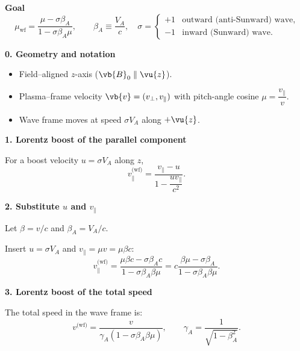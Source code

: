 \begin{tcolorbox}[colback=white, colframe=black, title={Step-by-Step Derivation of Pitch–Angle Cosine in the Wave Frame}]

\textbf{Goal}
\[
\boxed{
\mu_{\text{wf}} = \frac{\mu - \sigma \beta_A}{1 - \sigma \beta_A \mu}
},
\qquad
\beta_A \equiv \frac{V_A}{c}, \quad
\sigma =
\begin{cases}
+1 & \text{outward (anti-Sunward) wave},\\
-1 & \text{inward (Sunward) wave}.
\end{cases}
\]

\medskip

\textbf{0. Geometry and notation}

\begin{itemize}
\item Field–aligned $z$-axis ($\vb{B}_0 \parallel \vu{z}$).
\item Plasma–frame velocity $\vb{v} = (v_\perp, v_\parallel)$ with pitch-angle cosine $\mu = \dfrac{v_\parallel}{v}$.
\item Wave frame moves at speed $\sigma V_A$ along $+\vu{z}$.
\end{itemize}

\medskip

\textbf{1. Lorentz boost of the parallel component}

For a boost velocity $u = \sigma V_A$ along $z$,
\begin{equation}
v_\parallel^{\text{(wf)}} = 
\frac{v_\parallel - u}{1 - \dfrac{u v_\parallel}{c^2}}.
\tag{1}
\end{equation}

\medskip

\textbf{2. Substitute $u$ and $v_\parallel$}

Let $\beta = v/c$ and $\beta_A = V_A / c$.

Insert $u = \sigma V_A$ and $v_\parallel = \mu v = \mu \beta c$:
\begin{equation}
v_\parallel^{\text{(wf)}}
= \frac{\mu \beta c - \sigma \beta_A c}{1 - \sigma \beta_A \beta \mu}
= c \frac{\beta \mu - \sigma \beta_A}{1 - \sigma \beta_A \beta \mu}.
\tag{2}
\end{equation}

\medskip

\textbf{3. Lorentz boost of the total speed}

The total speed in the wave frame is:
\begin{equation}
v^{\text{(wf)}} =
\frac{v}{\gamma_A (1 - \sigma \beta_A \beta \mu)},
\qquad
\gamma_A = \frac{1}{\sqrt{1 - \beta_A^2}}.
\tag{3}
\end{equation}


\end{tcolorbox}
